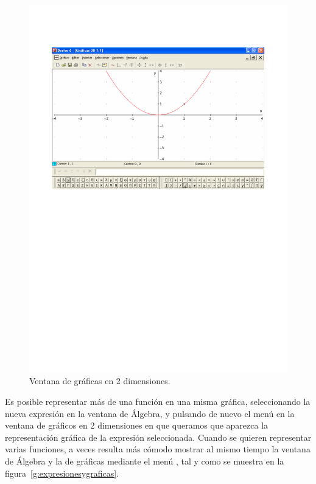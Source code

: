 \begin{figure}[h!]
\begin{center}
\includegraphics[scale=0.6]{img/introduccion_derive/2d-plot}
\caption{Ventana de gráficas en 2 dimensiones.} \label{g:2d-plot}
\end{center}
\end{figure}

Es posible representar más de una función en una misma gráfica,
seleccionando la nueva expresión en la ventana de Álgebra, y
pulsando de nuevo el menú  en la ventana
de gráficos en 2 dimensiones en que queramos que aparezca la
representación gráfica de la expresión seleccionada. Cuando se
quieren representar varias funciones, a veces resulta más cómodo
mostrar al mismo tiempo la ventana de Álgebra y la de gráficas
mediante el menú , tal y como se
muestra en la figura~\ref{g:expresionesygraficas}.


